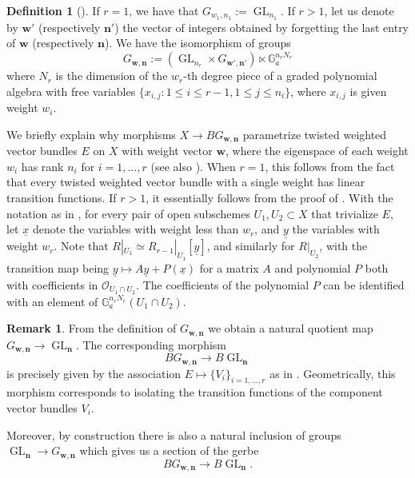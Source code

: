 \documentclass[12pt]{amsart}
\newcommand\G{\mathbb{G}}
\newcommand\Ga{\mathbb{G}_a}
\newcommand{\sO}{\mathscr{O}}
\newcommand{\GL}{\operatorname{GL}}
\theoremstyle{definition}
\newtheorem{Def}[theorem]{Definition}
\newtheorem{Rmk}[theorem]{Remark}
\begin{document}
\begin{Def}[{\cite[Section 2.1.7]{quek-rydh-weighted-blowup}}]
    If $r=1$, we have that $G_{w_1,n_1}:= \GL_{n_1}$. If $r>1$, let us denote by $\mathbf{w}'$ (respectively $\mathbf{n}'$) the vector of integers obtained by forgetting the last entry of $\mathbf{w}$ (respectively $\mathbf{n}$). We have the isomorphism of groups
    \[
        G_{\mathbf{w},\mathbf{n}}:= (\GL_{n_r} \times G_{\mathbf{w'},\mathbf{n}'}) \ltimes \G_a^{n_rN_r}
    \]
    where $N_r$ is the dimension of the $w_r$-th degree piece of a graded polynomial algebra with free variables $\{x_{i,j} : 1 \leq i\leq r -1, 1\leq j\leq n_i\}$, where $x_{i,j}$ is given weight $w_i$.
\end{Def}

We briefly explain why morphisms $X\rightarrow BG_{\mathbf{w},\mathbf{n}}$ parametrize twisted weighted vector bundles $E$ on $X$ with weight vector $\mathbf{w}$, where the eigenspace of each weight $w_i$ has rank $n_i$ for $i=1,\ldots,r$ (see also \cite[Section 2.1.7]{quek-rydh-weighted-blowup}). When $r=1$, this follows from the fact that every twisted weighted vector bundle with a single weight has linear transition functions. If $r>1$, it essentially follows from the proof of . With the notation as in , for every pair of open subschemes $U_1,U_2\subset X$ that trivialize $E$, let $\underline{x}$ denote the variables with weight less than $w_r$, and $\underline{y}$ the variables with weight $w_r$. Note that $R|_{U_1}\simeq R_{r-1}|_{U_1}[\underline{y}]$, and similarly for $R|_{U_2}$, with the transition map being $\underline{y}\mapsto A\underline{y}+P(\underline{x})$ for a matrix $A$ and polynomial $P$ both with coefficients in $\sO_{U_1\cap U_2}$. The coefficients of the polynomial $P$ can be identified with an element of $ \Ga^{n_rN_r}(U_1\cap U_2)$. 

\begin{Rmk}\label{rmk: natural_maps_G_Gln}
    From the definition of $G_{\mathbf{w},\mathbf{n}}$ we obtain a natural quotient map $G_{\mathbf{w},\mathbf{n}} \to  \GL_{\mathbf{n}}$. The corresponding morphism
    $$
    B G_{\mathbf{w},\mathbf{n}} \longrightarrow B\GL_{\mathbf{n}}
    $$
    is precisely given by the association $E\mapsto \{V_i\}_{i=1,\dots,r}$ as in . Geometrically, this morphism corresponds to isolating the transition functions of the component vector bundles $V_i$.
    
    
    Moreover, by construction there is also a natural inclusion of groups $\GL_{\mathbf{n}}\rightarrow G_{\mathbf{w},\mathbf{n}}$ which gives us a section of the gerbe
    $$ BG_{\mathbf{w},\mathbf{n}} \rightarrow B \GL_{\mathbf{n}}. $$
\end{Rmk}
\end{document}
